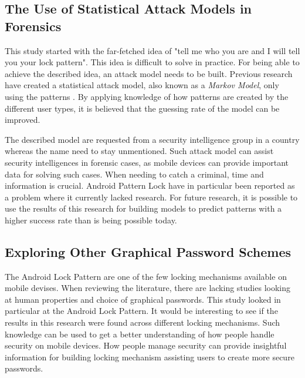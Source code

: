     \subsection{The Use of Statistical Attack Models in Forensics}
      This study started with the far-fetched idea of "tell me who you are and I will tell you your lock pattern". This idea is difficult to solve in practice. For being able to achieve the described idea, an attack model needs to be built. Previous research have created a statistical attack model, also known as a {\it Markov Model}, only using the patterns \cite{Uellenbeck}. By applying knowledge of how patterns are created by the different user types, it is believed that the guessing rate of the model can be improved. 

      The described model are requested from a security intelligence group in a country whereas the name need to stay unmentioned. Such attack model can assist security intelligences in forensic cases, as mobile devices can provide important data for solving such cases. When needing to catch a criminal, time and information is crucial. Android Pattern Lock have in particular been reported as a problem where it currently lacked research. For future research, it is possible to use the results of this research for building models to predict patterns with a higher success rate than is being possible today. 

    \subsection{Exploring Other Graphical Password Schemes}
      The Android Lock Pattern are one of the few locking mechanisms available on mobile devises. When reviewing the literature, there are lacking studies looking at human properties and choice of graphical passwords. This study looked in particular at the Android Lock Pattern. It would be interesting to see if the results in this research were found across different locking mechanisms. Such knowledge can be used to get a better understanding of how people handle security on mobile devices. How people manage security can provide insightful information for building locking mechanism assisting users to create more secure passwords.
    